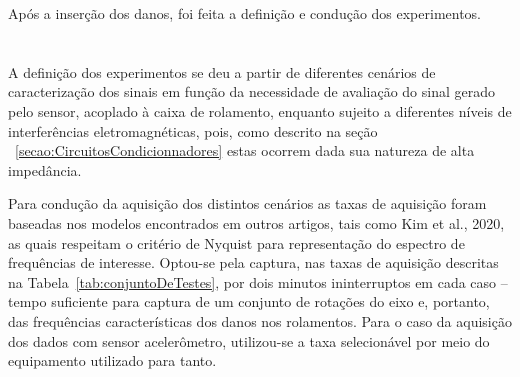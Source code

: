 \documentclass[
	12pt,				
	oneside,			
	a4paper,			
	english,			
	brazil,	
	sumario=abnt-6027-2012		
	]{abntex2ppgsi}
\begin{document}
Após a inserção dos danos, foi feita a definição e condução dos experimentos.

\section{}
\label{secao:definicaoExperimentos}

A definição dos experimentos se deu a partir de diferentes cenários de caracterização dos sinais em função da necessidade de avaliação do sinal gerado pelo sensor, acoplado à caixa de rolamento, enquanto sujeito a diferentes níveis de interferências eletromagnéticas, pois, como descrito na seção ~\ref{secao:CircuitosCondicionnadores} estas ocorrem dada sua natureza de alta impedância. 




Para condução da aquisição dos distintos cenários as taxas de aquisição foram baseadas nos modelos encontrados em outros artigos, tais como Kim et al., 2020, as quais respeitam o critério de Nyquist para representação do espectro de frequências de interesse. Optou-se pela captura, nas taxas de aquisição descritas na Tabela~\ref{tab:conjuntoDeTestes}, por dois minutos ininterruptos em cada caso – tempo suficiente para captura de um conjunto de rotações do eixo e, portanto, das frequências características dos danos nos rolamentos. Para o caso da aquisição dos dados com sensor acelerômetro, utilizou-se a taxa selecionável por meio do equipamento utilizado para tanto.
\end{document}

